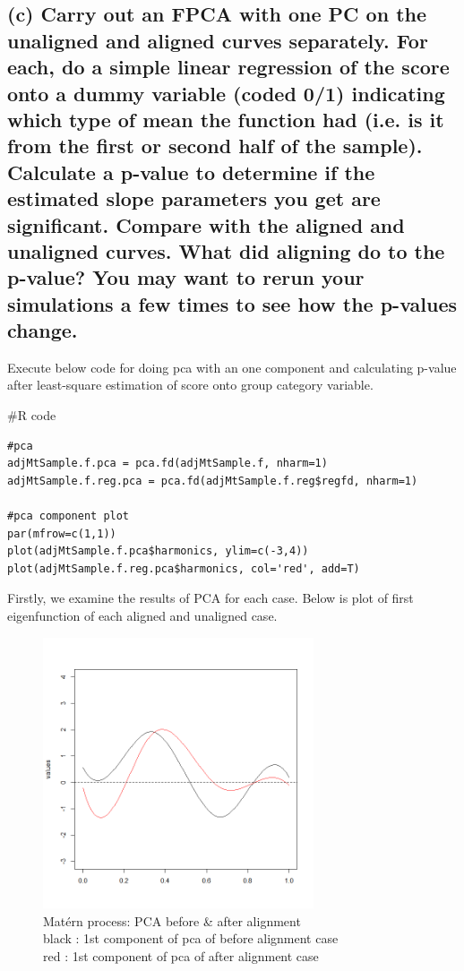 \documentclass{article}
\newenvironment{Rcode}%
{%
    \begin{mdframed}
    \#R code
    \begin{small}
}
{%
    \end{small}
    \end{mdframed}
}
\begin{document}
\newpage
\subsection*{(c) Carry out an FPCA with one PC on the unaligned and aligned curves separately. 
For each, do a simple linear regression of the score onto a dummy variable (coded 0/1) 
indicating which type of mean the function had (i.e. is it from the first or second half of the sample). 
Calculate a p-value to determine if the estimated slope parameters you get are significant. 
Compare with the aligned and unaligned curves. What did aligning do to the p-value? 
You may want to rerun your simulations a few times to see how the p-values change.}

Execute below code for doing pca with an one component and calculating p-value after least-square estimation of score onto group category variable.
\begin{Rcode}
    \begin{verbatim}
#pca
adjMtSample.f.pca = pca.fd(adjMtSample.f, nharm=1)
adjMtSample.f.reg.pca = pca.fd(adjMtSample.f.reg$regfd, nharm=1)

#pca component plot
par(mfrow=c(1,1))
plot(adjMtSample.f.pca$harmonics, ylim=c(-3,4))
plot(adjMtSample.f.reg.pca$harmonics, col='red', add=T)
    \end{verbatim}
\end{Rcode}

Firstly, we examine the results of PCA for each case. Below is plot of first eigenfunction of each aligned and unaligned case.

\begin{figure}[hh]
    \centering
    \includegraphics[height=8cm]{matern_pca_component.png}
    \caption{Mat\'{e}rn process: PCA before \& after alignment \\
    black : 1st component of pca of before alignment case\\
    red : 1st component of pca of after alignment case}
\end{figure}
\end{document}
